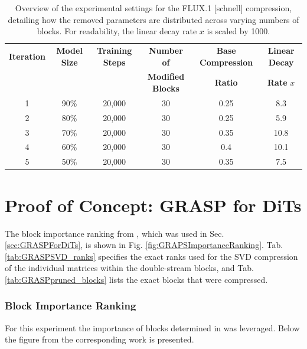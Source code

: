 \begin{table}[H]
	\centering
	\caption[SVDtrunc FLUX.1 {[schnell]}: Compression Details]{Overview of the experimental settings for the FLUX.1 [schnell] compression, detailing how the removed parameters are distributed across varying numbers of blocks. For readability, the linear decay rate $x$ is scaled by 1000.}
	\label{tab:FluxDSchnell}
	\begin{tabular}{cccccc}
		\toprule
		\textbf{Iteration} &\textbf{Model Size} & \textbf{Training Steps} & \textbf{Number of} & \textbf{Base Compression} & \textbf{Linear Decay}\\
		&&&\textbf{Modified Blocks}&\textbf{Ratio}& \textbf{Rate} $x$\\
		\midrule
		
		1 &  90\%&  20,000 & 30 & 0.25 & 8.3 \\
		

		
		
		2 & 80\% & 20,000 &  30 & 0.25 & 5.9 \\
		
	
		
		3 & 70\% & 20,000 &  30 & 0.35  & 10.8 \\
		
	
		
		4& 60\% &  20,000 & 30 & 0.4  & 10.1 \\
		
	
		
		5& 50\%  &20,000 & 30  & 0.35 & 7.5  \\
		
		
		\bottomrule
	\end{tabular}
\end{table}




\section{Proof of Concept: GRASP for \gls{DiT}s}
The block importance ranking from \cite{FastFlux}, which was used in Sec. \ref{sec:GRASPForDiTs}, is shown in Fig. \ref{fig:GRAPSImportanceRanking}. Tab. \ref{tab:GRASPSVD_ranks} specifies the exact ranks used for the \gls{SVD} compression of the individual matrices within the double-stream blocks, and Tab. \ref{tab:GRASPpruned_blocks} lists the exact blocks that were compressed.
\subsubsection{Block Importance Ranking}
\label{app:GRASP_BlockImportance}
For this experiment the importance of blocks determined in \cite{FastFlux} was leveraged. Below the figure from the corresponding work is presented. 

